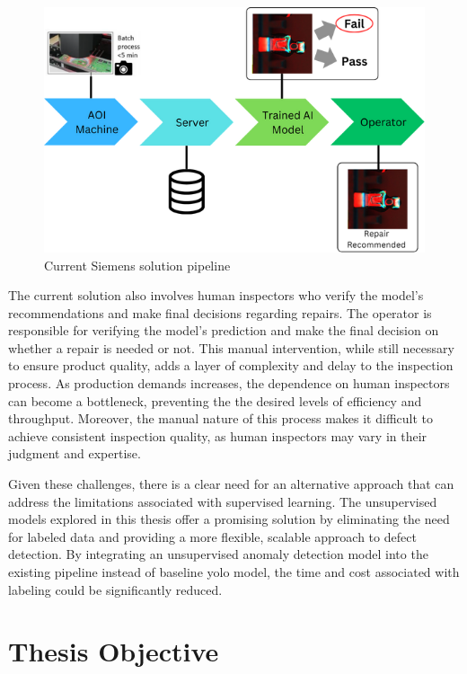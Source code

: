 \begin{figure}[ht!]
    \centering
    \includegraphics[width=1\linewidth]{Images/Solution_Pipeline.png}
    \caption{Current Siemens solution pipeline}
    \label{fig:solution pipeline}
\end{figure}

The current solution also involves human inspectors who verify the model's recommendations and make final decisions regarding repairs. The operator is responsible for verifying the model's prediction and make the final decision on whether a repair is needed or not. This manual intervention, while still necessary to ensure product quality, adds a layer of complexity and delay to the inspection process. As production demands increases, the dependence on human inspectors can become a bottleneck, preventing the the desired levels of efficiency and throughput. Moreover, the manual nature of this process makes it difficult to achieve consistent inspection quality, as human inspectors may vary in their judgment and expertise.

Given these challenges, there is a clear need for an alternative approach that can address the limitations associated with supervised learning. The unsupervised models explored in this thesis offer a promising solution by eliminating the need for labeled data and providing a more flexible, scalable approach to defect detection. By integrating an unsupervised anomaly detection model into the existing pipeline instead of baseline \gls{yolo} model, the time and cost associated with labeling could be significantly reduced. 

\section{Thesis Objective}

